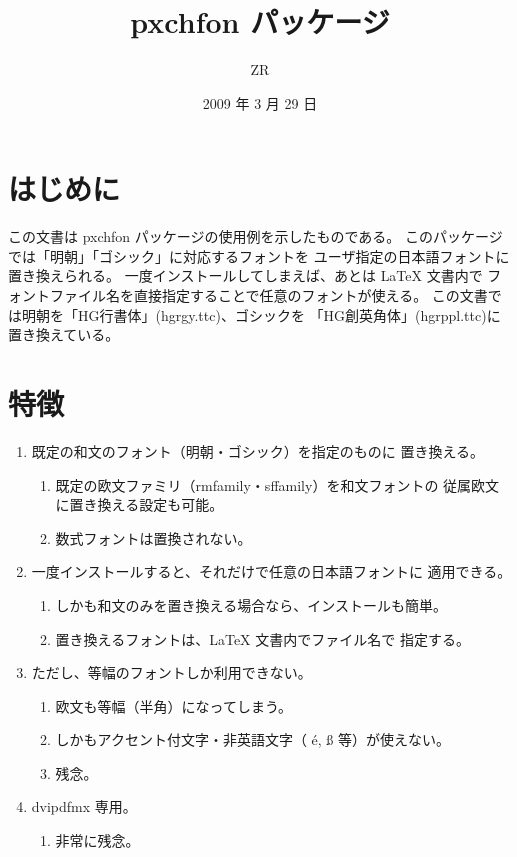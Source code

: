 \documentclass[a4paper]{jsarticle}
\begin{document}
\title{pxchfon パッケージ}
\author{ZR}
\date{2009 年 3 月 29 日}
\maketitle

\section{はじめに}
この文書は pxchfon パッケージの使用例を示したものである。
このパッケージでは「明朝」「ゴシック」に対応するフォントを
ユーザ指定の日本語フォントに置き換えられる。
一度インストールしてしまえば、あとは {\LaTeX} 文書内で
フォントファイル名を直接指定することで任意のフォントが使える。
この文書では明朝を「HG行書体」(hgrgy.ttc)、ゴシックを
\textsf{「HG創英角体」(hgrppl.ttc)}に置き換えている。

\section{特徴}
\begin{enumerate}
\item 既定の和文のフォント（明朝・ゴシック）を指定のものに
  置き換える。
  \begin{enumerate}
  \item 既定の欧文ファミリ（rmfamily・sffamily）を和文フォントの
    従属欧文に置き換える設定も可能。
  \item 数式フォントは置換されない。
  \end{enumerate}
\item 一度インストールすると、それだけで任意の日本語フォントに
  適用できる。
  \begin{enumerate}
  \item しかも和文のみを置き換える場合なら、インストールも簡単。
  \item 置き換えるフォントは、{\LaTeX} 文書内でファイル名で
    指定する。
  \end{enumerate}
\item ただし、等幅のフォントしか利用できない。
  \begin{enumerate}
  \item 欧文も等幅（半角）になってしまう。
  \item しかもアクセント付文字・非英語文字（
    {\selectfont \'e, \ss} 等）が使えない。
  \item 残念。
  \end{enumerate}
\item dvipdfmx 専用。
  \begin{enumerate}
  \item 非常に残念。
  \end{enumerate}
\end{enumerate}
\end{document}
